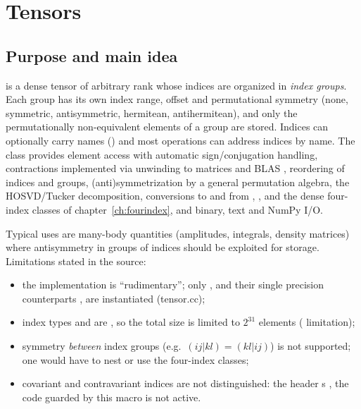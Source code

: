 \chapter{Tensors}\label{ch:tensor}


\section{Purpose and main idea}\label{sec:tensor:purpose}

 is a dense tensor of arbitrary rank whose indices are organized in \emph{index groups}.
Each group has its own index range, offset and permutational symmetry (none, symmetric, antisymmetric,
hermitean, antihermitean), and only the permutationally non-equivalent elements of a group are stored.
Indices can optionally carry names () and most operations can address indices by name.
The class provides element access with automatic sign/conjugation handling, contractions implemented via
unwinding to matrices and BLAS , reordering of indices and groups, (anti)symmetrization by a
general permutation algebra, the HOSVD/Tucker decomposition, conversions to and from ,
,  and the dense four-index classes of chapter~\ref{ch:fourindex}, and binary,
text and NumPy I/O.

Typical uses are many-body quantities (amplitudes, integrals, density matrices) where antisymmetry
in groups of indices should be exploited for storage.
Limitations stated in the source:
\begin{itemize}
\item the implementation is ``rudimentary''; only ,  and their single precision
	counterparts ,  are instantiated (tensor.cc);
\item index types  and  are , so the total size is limited
	to $2^{31}$ elements ( limitation);
\item symmetry \emph{between} index groups (e.g.\ $(ij|kl)=(kl|ij)$) is not supported; one would have to
	nest  or use the four-index classes;
\item covariant and contravariant indices are not distinguished: the header s
	, the code guarded by this macro is not active.
\end{itemize}

